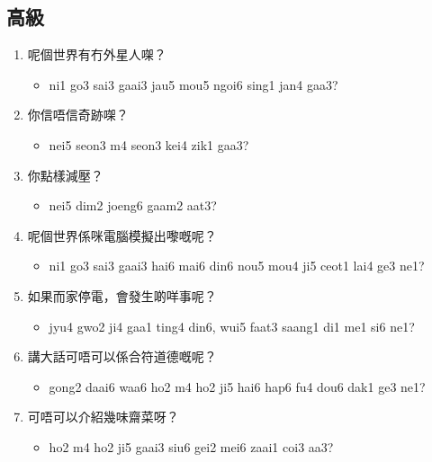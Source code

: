 \documentclass[12pt,a4paper]{leaflet}
\begin{document}
\begin{tcolorbox}[enhanced, breakable, skin first=enhanced, skin middle=enhanced, skin last=enhanced,colback=LightCoral!20!white, colframe=LightCoral!50!black, boxrule=0.5mm]
\subsection*{高級}
\begin{enumerate}[label={},leftmargin=0pt, itemindent=0pt]
\item \LARGE{呢個世界有冇外星人㗎？}
\begin{itemize}[label={},leftmargin=0pt, itemindent=0pt]
\item \footnotesize\textsf{ni1 go3 sai3 gaai3 jau5 mou5 ngoi6 sing1 jan4 gaa3?}
\end{itemize}
\item \LARGE{你信唔信奇跡㗎？}
\begin{itemize}[label={},leftmargin=0pt, itemindent=0pt]
\item \footnotesize\textsf{nei5 seon3 m4 seon3 kei4 zik1 gaa3?}
\end{itemize}
\item \LARGE{你點樣減壓？}
\begin{itemize}[label={},leftmargin=0pt, itemindent=0pt]
\item \footnotesize\textsf{nei5 dim2 joeng6 gaam2 aat3?}
\end{itemize}
\item \LARGE{呢個世界係咪電腦模擬出嚟嘅呢？}
\begin{itemize}[label={},leftmargin=0pt, itemindent=0pt]
\item \footnotesize\textsf{ni1 go3 sai3 gaai3 hai6 mai6 din6 nou5 mou4 ji5 ceot1 lai4 ge3 ne1?}
\end{itemize}
\item \LARGE{如果而家停電，會發生啲咩事呢？}
\begin{itemize}[label={},leftmargin=0pt, itemindent=0pt]
\item \footnotesize\textsf{jyu4 gwo2 ji4 gaa1 ting4 din6, wui5 faat3 saang1 di1 me1 si6 ne1?}
\end{itemize}
\item \LARGE{講大話可唔可以係合符道德嘅呢？}
\begin{itemize}[label={},leftmargin=0pt, itemindent=0pt]
\item \footnotesize\textsf{gong2 daai6 waa6 ho2 m4 ho2 ji5 hai6 hap6 fu4 dou6 dak1 ge3 ne1?}
\end{itemize}
\item \LARGE{可唔可以介紹幾味齋菜呀？}
\begin{itemize}[label={},leftmargin=0pt, itemindent=0pt]
\item \footnotesize\textsf{ho2 m4 ho2 ji5 gaai3 siu6 gei2 mei6 zaai1 coi3 aa3?}

\end{itemize}
\end{enumerate}
\end{tcolorbox}
\end{document}
